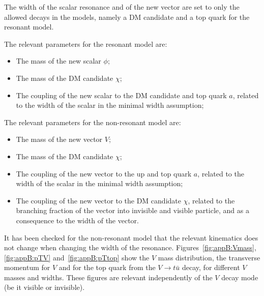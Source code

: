 The width of the scalar resonance and of the new vector are set to only the allowed decays in the models,
namely a DM candidate and a top quark for the resonant model. 




The relevant parameters for the resonant model are:
\begin{itemize}
	\item The mass of the new scalar $\phi$;
	\item The mass of the DM candidate $\chi$;
	\item The coupling of the new scalar to the DM candidate and top quark $a$, 
	related to the width of the scalar in the minimal width assumption;
\end{itemize}	

The relevant parameters for the non-resonant model are:
\begin{itemize}
	\item The mass of the new vector $V$;
	\item The mass of the DM candidate $\chi$;
	\item The coupling of the new vector to the up and top quark $a$, 
	related to the width of the scalar in the minimal width assumption;
	\item The coupling of the new vector to the DM candidate $\chi$, 
	related to the branching fraction of the vector into invisible and visible particle,
	and as a consequence to the width of the vector. 
\end{itemize}	

It has been checked for the non-resonant model that the relevant kinematics does not change when changing the width of the resonance. Figures~\ref{fig:appB:Vmass}, \ref{fig:appB:pTV} and~\ref{fig:appB:pTtop} show the $V$ mass distribution, the transverse momentum for $V$ and for the top quark from the $V\to t\bar{u}$ decay, for different $V$ masses and widths.
These figures are relevant independently of the $V$ decay mode (be it visible or invisible). 

